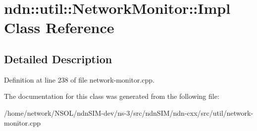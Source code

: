 \hypertarget{classndn_1_1util_1_1NetworkMonitor_1_1Impl}{}\section{ndn\+:\+:util\+:\+:Network\+Monitor\+:\+:Impl Class Reference}
\label{classndn_1_1util_1_1NetworkMonitor_1_1Impl}


\subsection{Detailed Description}


Definition at line 238 of file network-\/monitor.\+cpp.



The documentation for this class was generated from the following file\+:\begin{DoxyCompactItemize}
\item 
/home/network/\+N\+S\+O\+L/ndn\+S\+I\+M-\/dev/ns-\/3/src/ndn\+S\+I\+M/ndn-\/cxx/src/util/network-\/monitor.\+cpp\end{DoxyCompactItemize}
